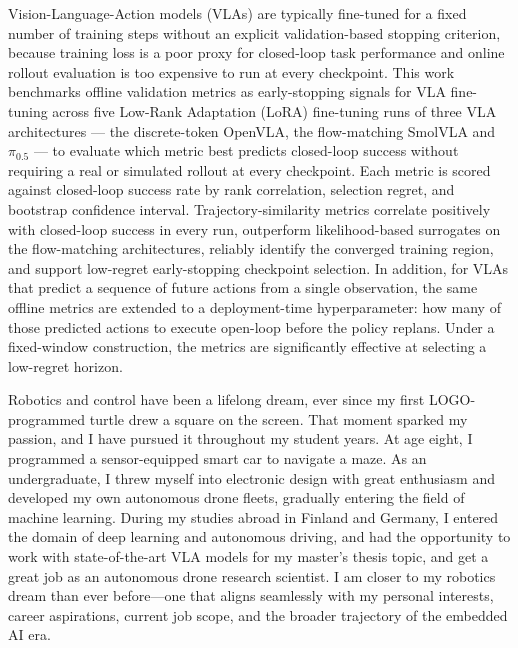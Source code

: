 \documentclass[english,12pt,a4paper,pdftex,elec,utf8]{aaltothesis}
\begin{document}
\makecoverpage



\begin{abstractpage}[english]

Vision-Language-Action models (VLAs) are typically fine-tuned for a fixed number of training steps without an explicit validation-based stopping criterion, because training loss is a poor proxy for closed-loop task performance and online rollout evaluation is too expensive to run at every checkpoint. This work benchmarks offline validation metrics as early-stopping signals for VLA fine-tuning across five Low-Rank Adaptation (LoRA) fine-tuning runs of three VLA architectures --- the discrete-token OpenVLA, the flow-matching SmolVLA and $\pi_{0.5}$ --- to evaluate which metric best predicts closed-loop success without requiring a real or simulated rollout at every checkpoint. Each metric is scored against closed-loop success rate by rank correlation, selection regret, and bootstrap confidence interval. Trajectory-similarity metrics correlate positively with closed-loop success in every run, outperform likelihood-based surrogates on the flow-matching architectures, reliably identify the converged training region, and support low-regret early-stopping checkpoint selection. In addition, for VLAs that predict a sequence of future actions from a single observation, the same offline metrics are extended to a deployment-time hyperparameter: how many of those predicted actions to execute open-loop before the policy replans. Under a fixed-window construction, the metrics are significantly effective at selecting a low-regret horizon.
\end{abstractpage}


Robotics and control have been a lifelong dream, ever since my first LOGO-programmed turtle drew a square on the screen. That moment sparked my passion, and I have pursued it throughout my student years. At age eight, I programmed a sensor-equipped smart car to navigate a maze. As an undergraduate, I threw myself into electronic design with great enthusiasm and developed my own autonomous drone fleets, gradually entering the field of machine learning. During my studies abroad in Finland and Germany, I entered the domain of deep learning and autonomous driving, and had the opportunity to work with state-of-the-art VLA models for my master's thesis topic, and get a great job as an autonomous drone research scientist. I am closer to my robotics dream than ever before—one that aligns seamlessly with my personal interests, career aspirations, current job scope, and the broader trajectory of the embedded AI era.
\end{document}
